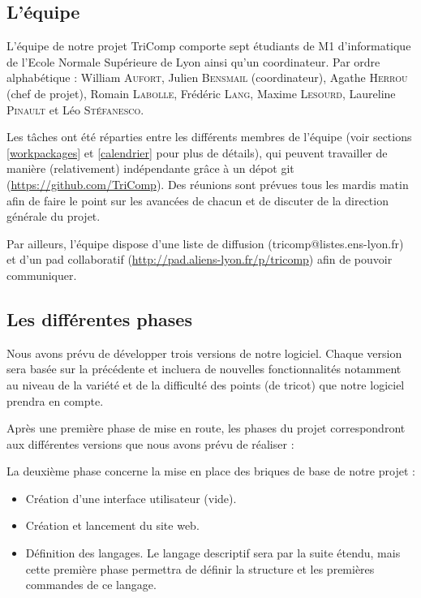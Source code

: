\documentclass{article}
\begin{document}
\subsection{L'équipe}

L'équipe de notre projet TriComp comporte sept étudiants de M1 d'informatique de l'Ecole Normale Supérieure de Lyon ainsi qu'un coordinateur. Par ordre alphabétique : William \textsc{Aufort}, 
Julien \textsc{Bensmail} (coordinateur), Agathe \textsc{Herrou} (chef de projet), Romain \textsc{Labolle}, Frédéric \textsc{Lang}, Maxime 
\textsc{Lesourd}, Laureline \textsc{Pinault} et Léo \textsc{Stéfanesco}. \newline

Les tâches ont été réparties entre les différents membres de l'équipe (voir sections \ref{workpackages} et \ref{calendrier} pour plus de détails), qui peuvent travailler de manière (relativement) indépendante grâce à un dépot git (\url{https://github.com/TriComp}). Des réunions sont prévues tous les mardis matin afin de faire le point sur les avancées de chacun et de discuter de la direction générale du projet.

Par ailleurs, l'équipe dispose d'une liste de diffusion (tricomp@listes.ens-lyon.fr) et d'un pad collaboratif (\url{http://pad.aliens-lyon.fr/p/tricomp}) afin de pouvoir communiquer.

\subsection{Les différentes phases}

Nous avons prévu de développer trois versions de notre logiciel. Chaque version sera basée sur la précédente et incluera de nouvelles 
fonctionnalités notamment au niveau de la variété et de la difficulté des points (de tricot) que notre logiciel prendra en compte. \newline

Après une première phase de mise en route, les phases du projet correspondront aux différentes versions que nous avons prévu de réaliser :

La deuxième phase concerne la mise en place des briques de base de notre projet :
    \begin{itemize}
     \item Création d'une interface utilisateur (vide).
     \item Création et lancement du site web.
     \item Définition des langages. Le langage descriptif sera par la suite étendu, mais cette première phase permettra de définir la 
structure et les premières commandes de ce langage.
    \end{itemize}
\end{document}
